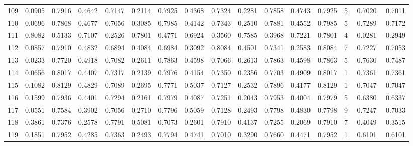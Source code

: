 \begin{tabular}{lrrrrrrrrrrrrrrr}
109 &      0.0905 &  0.7916 &  0.4642 &  0.7147 &  0.2114 &  0.7925 &  0.4368 &  0.7324 &  0.2281 &  0.7858 &   0.4743 &     0.7925 &      5 &                    0.7020 &                     0.7011 \\
110 &      0.0696 &  0.7868 &  0.4677 &  0.7056 &  0.3085 &  0.7985 &  0.4142 &  0.7343 &  0.2510 &  0.7881 &   0.4552 &     0.7985 &      5 &                    0.7289 &                     0.7172 \\
111 &      0.8082 &  0.5133 &  0.7107 &  0.2526 &  0.7801 &  0.4771 &  0.6924 &  0.3560 &  0.7585 &  0.3968 &   0.7221 &     0.7801 &      4 &                   -0.0281 &                    -0.2949 \\
112 &      0.0857 &  0.7910 &  0.4832 &  0.6894 &  0.4084 &  0.6984 &  0.3092 &  0.8084 &  0.4501 &  0.7341 &   0.2583 &     0.8084 &      7 &                    0.7227 &                     0.7053 \\
113 &      0.0233 &  0.7720 &  0.4918 &  0.7082 &  0.2611 &  0.7863 &  0.4598 &  0.7066 &  0.2613 &  0.7863 &   0.4598 &     0.7863 &      5 &                    0.7630 &                     0.7487 \\
114 &      0.0656 &  0.8017 &  0.4407 &  0.7317 &  0.2139 &  0.7976 &  0.4154 &  0.7350 &  0.2356 &  0.7703 &   0.4909 &     0.8017 &      1 &                    0.7361 &                     0.7361 \\
115 &      0.1082 &  0.8129 &  0.4829 &  0.7089 &  0.2695 &  0.7771 &  0.5037 &  0.7127 &  0.2532 &  0.7896 &   0.4177 &     0.8129 &      1 &                    0.7047 &                     0.7047 \\
116 &      0.1599 &  0.7936 &  0.4401 &  0.7294 &  0.2161 &  0.7979 &  0.4087 &  0.7251 &  0.2043 &  0.7953 &   0.4004 &     0.7979 &      5 &                    0.6380 &                     0.6337 \\
117 &      0.0551 &  0.7584 &  0.3902 &  0.7056 &  0.2710 &  0.7796 &  0.5059 &  0.7128 &  0.2493 &  0.7798 &   0.4830 &     0.7798 &      9 &                    0.7247 &                     0.7033 \\
118 &      0.3861 &  0.7376 &  0.2578 &  0.7791 &  0.5081 &  0.7073 &  0.2601 &  0.7910 &  0.4137 &  0.7255 &   0.2069 &     0.7910 &      7 &                    0.4049 &                     0.3515 \\
119 &      0.1851 &  0.7952 &  0.4285 &  0.7363 &  0.2493 &  0.7794 &  0.4741 &  0.7010 &  0.3290 &  0.7660 &   0.4471 &     0.7952 &      1 &                    0.6101 &                     0.6101 \\

\end{tabular}
